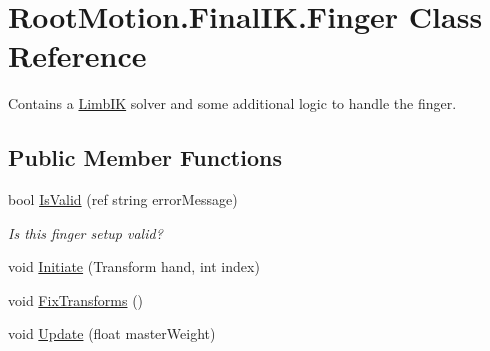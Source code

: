 \hypertarget{class_root_motion_1_1_final_i_k_1_1_finger}{}\section{Root\+Motion.\+Final\+I\+K.\+Finger Class Reference}
\label{class_root_motion_1_1_final_i_k_1_1_finger}


Contains a \mbox{\hyperlink{class_root_motion_1_1_final_i_k_1_1_limb_i_k}{Limb\+IK}} solver and some additional logic to handle the finger.  


\subsection*{Public Member Functions}
\begin{DoxyCompactItemize}
\item 
bool \mbox{\hyperlink{class_root_motion_1_1_final_i_k_1_1_finger_ae9efb1adbdb73e37114b8cccfae88d9b}{Is\+Valid}} (ref string error\+Message)
\begin{DoxyCompactList}\small\item\em Is this finger setup valid? \end{DoxyCompactList}\item 
void \mbox{\hyperlink{class_root_motion_1_1_final_i_k_1_1_finger_a0ddbb8827ec12d4b95e422ef2680e68f}{Initiate}} (Transform hand, int index)
\item 
void \mbox{\hyperlink{class_root_motion_1_1_final_i_k_1_1_finger_aa660ea3d2f1dc6b02cf1c402d8f441b5}{Fix\+Transforms}} ()
\item 
void \mbox{\hyperlink{class_root_motion_1_1_final_i_k_1_1_finger_ac994621fdf68a9b8e081123bb69e8da5}{Update}} (float master\+Weight)
\end{DoxyCompactItemize}
